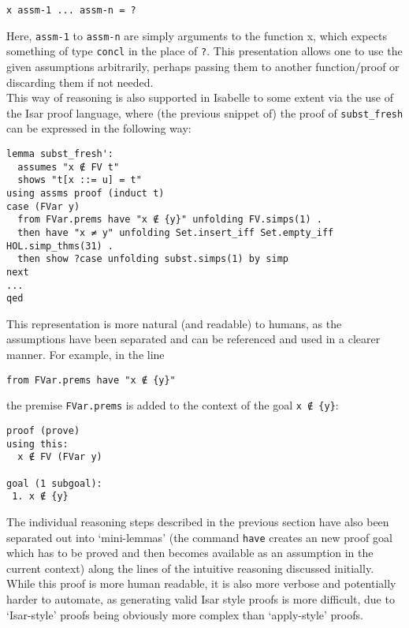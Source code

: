\documentclass[a4paper, 12pt, twoside]{style/ociamthesis}
\theoremstyle{plain}
\theoremstyle{definition}
\theoremstyle{remark}
\begin{document}
\begin{verbatim}
x assm-1 ... assm-n = ?
\end{verbatim}

Here, \texttt{assm-1} to \texttt{assm-n} are simply arguments to the
function x, which expects something of type \texttt{concl} in the place
of \texttt{?}. This presentation allows one to use the given assumptions
arbitrarily, perhaps passing them to another function/proof or
discarding them if not needed.\\
This way of reasoning is also supported in Isabelle to some extent via
the use of the Isar proof language, where (the previous snippet of) the
proof of \texttt{subst\_fresh} can be expressed in the following way:

\begin{verbatim}
lemma subst_fresh': 
  assumes "x ∉ FV t"
  shows "t[x ::= u] = t"
using assms proof (induct t)
case (FVar y)
  from FVar.prems have "x ∉ {y}" unfolding FV.simps(1) .
  then have "x ≠ y" unfolding Set.insert_iff Set.empty_iff HOL.simp_thms(31) .
  then show ?case unfolding subst.simps(1) by simp
next
...
qed
\end{verbatim}

This representation is more natural (and readable) to humans, as the
assumptions have been separated and can be referenced and used in a
clearer manner. For example, in the line

\begin{verbatim}
from FVar.prems have "x ∉ {y}"
\end{verbatim}

the premise \texttt{FVar.prems} is added to the context of the goal
\texttt{x ∉ \{y\}}:

\begin{verbatim}
proof (prove)
using this:
  x ∉ FV (FVar y)

goal (1 subgoal):
 1. x ∉ {y}
\end{verbatim}

The individual reasoning steps described in the previous section have
also been separated out into `mini-lemmas' (the command \texttt{have}
creates an new proof goal which has to be proved and then becomes
available as an assumption in the current context) along the lines of
the intuitive reasoning discussed initially. While this proof is more
human readable, it is also more verbose and potentially harder to
automate, as generating valid Isar style proofs is more difficult, due
to `Isar-style' proofs being obviously more complex than `apply-style'
proofs.
\end{document}
